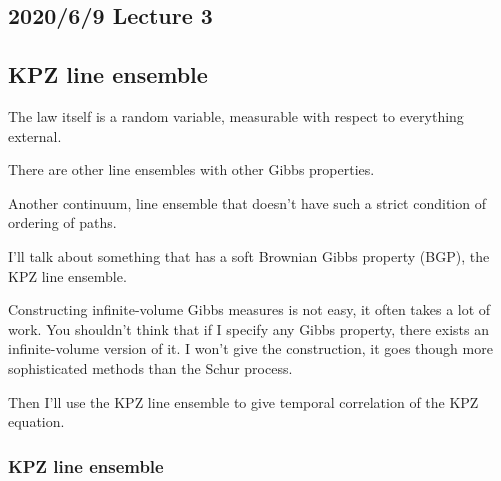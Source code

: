 



\subsection*{2020/6/9 Lecture 3}

\subsection{KPZ line ensemble}
The law itself is a random variable, measurable with respect to everything external.

There are other line ensembles with other Gibbs properties.

Another continuum, line ensemble that doesn't have such a strict condition of ordering of paths.

I'll talk about something that has a soft Brownian Gibbs property (BGP), the KPZ line ensemble. 

Constructing infinite-volume Gibbs measures is not easy, it often takes a lot of work. You shouldn't think that if I specify any Gibbs property, there exists an infinite-volume version of it.
I won't give the construction, it goes though more sophisticated methods than the Schur process.

Then I'll use the KPZ line ensemble to give temporal correlation of the KPZ equation.

\subsubsection{KPZ line ensemble}

